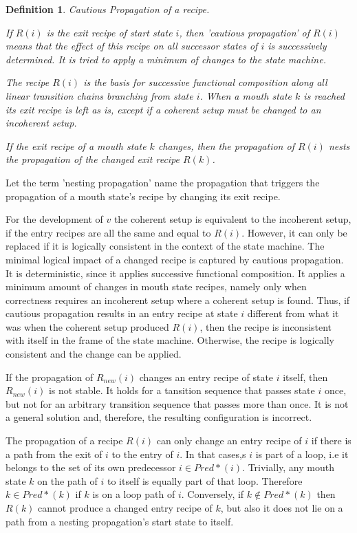 \documentclass[12pt,a4paper]{scrartcl}
\newtheorem{definition}{Definition}
\begin{document}
\begin{definition} Cautious Propagation of a recipe.
    
    If $R(i)$ is the exit recipe of start state $i$, then 'cautious propagation'
    of $R(i)$ means that the effect of this recipe on all successor states of
    $i$ is successively determined. It is tried to apply a minimum of changes
    to the state machine.

    The recipe $R(i)$ is the basis for successive functional composition along
    all linear transition chains branching from state $i$. When a mouth state
    $k$ is reached its exit recipe is left as is, except if a coherent
    setup must be changed to an incoherent setup.
    
    If the exit recipe of a  mouth state $k$ changes, then the propagation of
    $R(i)$ nests the propagation of the changed exit recipe $R(k)$. 
    
\end{definition}

Let the term 'nesting propagation' name the propagation that triggers the
propagation of a mouth state's recipe by changing its exit recipe.

For the development of $v$ the coherent setup is equivalent to the incoherent
setup, if the entry recipes are all the same and equal to $R(i)$. However, it
can only be replaced if it is logically consistent in the context of the state
machine. The minimal logical impact of a changed recipe is captured by cautious
propagation. It is deterministic, since it applies successive functional
composition. It applies a minimum amount of changes in mouth state recipes,
namely only when correctness requires an incoherent setup where a coherent
setup is found. Thus, if cautious propagation results in an entry recipe at
state $i$ different from what it was when the coherent setup produced $R(i)$,
then the recipe is inconsistent with itself in the frame of the state machine.
Otherwise, the recipe is logically consistent and the change can be applied.

If the propagation of $R_{new}(i)$ changes an entry recipe of state $i$ itself,
then $R_{new}(i)$ is not stable.  It holds for a tansition sequence that passes
state $i$ once, but not for an arbitrary transition sequence that passes more
than once.  It is not a general solution and, therefore, the resulting
configuration is incorrect.  

The propagation of a recipe $R(i)$ can only change an entry recipe of $i$ if
there is a path from the exit of $i$ to the entry of $i$. In that cases,s $i$
is part of a loop, i.e it belongs to the set of its own predecessor $i\in
Pred*(i)$. Trivially, any mouth state $k$ on the path of $i$ to itself is
equally part of that loop. Therefore $k\in Pred*(k)$ if $k$ is on a loop path
of $i$. Conversely, if $k\notin Pred*(k)$  then $R(k)$ cannot produce a changed
entry recipe of $k$, but also it does not lie on a path from a nesting
propagation's start state to itself. 
\end{document}
